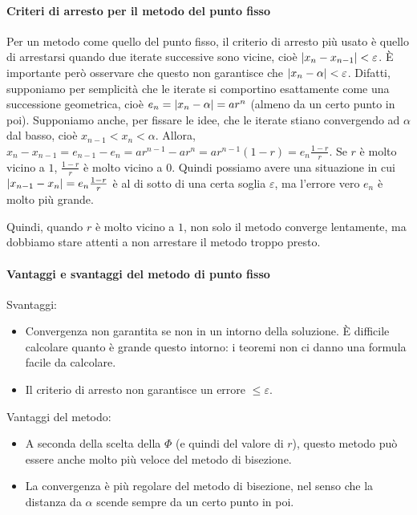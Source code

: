 \documentclass[a4paper]{report}
\DeclarePairedDelimiter{\abs}{\lvert}{\rvert}
\theoremstyle{definiton}
\theoremstyle{remark}
\begin{document}
\paragraph{Criteri di arresto per il metodo del punto fisso}

Per un metodo come quello del punto fisso, il criterio di arresto più usato è quello di arrestarsi quando due iterate successive sono vicine, cioè $\abs{x_{n} - x_{n-1}} < \varepsilon$. È importante però osservare che questo non garantisce che $\abs{x_n - \alpha} < \varepsilon$. Difatti, supponiamo per semplicità che le iterate si comportino esattamente come una successione geometrica, cioè $e_n = \abs{x_n-\alpha} = ar^n$ (almeno da un certo punto in poi). Supponiamo anche, per fissare le idee, che le iterate stiano convergendo ad $\alpha$ dal basso, cioè $x_{n-1} < x_{n} < \alpha$. Allora, $x_{n} - x_{n-1} = e_{n-1} - e_n = ar^{n-1} - ar^n = ar^{n-1}(1-r) = e_n \frac{1-r}{r}$. Se $r$ è molto vicino a $1$, $\frac{1-r}{r}$ è molto vicino a $0$. Quindi possiamo avere una situazione in cui $\abs{x_{n-1}-x_n} = e_n \frac{1-r}{r}$ è al di sotto di una certa soglia $\varepsilon$, ma l'errore vero $e_n$ è molto più grande.

Quindi, quando $r$ è molto vicino a $1$, non solo il metodo converge lentamente, ma dobbiamo stare attenti a non arrestare il metodo troppo presto.

\paragraph{Vantaggi e svantaggi del metodo di punto fisso}

Svantaggi:
\begin{itemize}
    \item Convergenza non garantita se non in un intorno della soluzione. È difficile calcolare quanto è grande questo intorno: i teoremi non ci danno una formula facile da calcolare.
    \item Il criterio di arresto non garantisce un errore $\leq \varepsilon$.
\end{itemize}
Vantaggi del metodo:
\begin{itemize}
    \item A seconda della scelta della $\Phi$ (e quindi del valore di $r$), questo metodo può essere anche molto più veloce del metodo di bisezione.
    \item La convergenza è più regolare del metodo di bisezione, nel senso che la distanza da $\alpha$ scende sempre da un certo punto in poi. 
\end{itemize}
\end{document}
